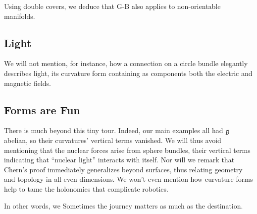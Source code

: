 \documentclass[twocolumn, 11pt]{article}
\newcommand{\gG}{\frak{g}}
\theoremstyle{definition}
\newcommand{\msec}[1]{\subsection*{\color{mblu}\textsf{#1}}}
\begin{document}
        Using double covers, we deduce that G-B also applies to non-orientable
        manifolds.

    \msec{Light}
        We will not mention, for
        instance, how a connection on a circle bundle elegantly describes
        light, its curvature form containing as components both the electric
        and magnetic fields. 

    \msec{Forms are Fun}
        There is much beyond this tiny tour.  Indeed, our main examples all had
        $\gG$ abelian, so their curvatures' vertical terms vanished.  We will
        thus avoid mentioning that the nuclear forces arise from sphere
        bundles, their vertical terms indicating that ``nuclear light''
        interacts with itself.  Nor will we remark that Chern's proof
        immediately generalizes beyond surfaces, thus relating geometry and
        topology in all even dimensions.  We won't even mention how curvature
        forms help to tame the holonomies that complicate robotics.

        In other words, we  
        Sometimes the journey matters as much as the destination.  



\end{document}
